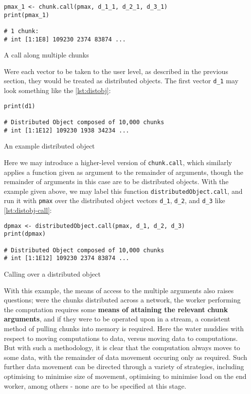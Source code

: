 \begin{listing}
    \begin{verbatim}
pmax_1 <- chunk.call(pmax, d_1_1, d_2_1, d_3_1)
print(pmax_1)

# 1 chunk:
# int [1:1E8] 109230 2374 83874 ...
    \end{verbatim}
    \caption{A call along multiple chunks}
    \label{lst:call-along-chunks}
\end{listing}

Were each vector to be taken to the user level, as described in the
previous section, they would be treated as distributed objects. The
first vector \texttt{d\_1} may look something like the \ref{lst:distobj}:

\begin{listing}
    \begin{verbatim}
print(d1)

# Distributed Object composed of 10,000 chunks
# int [1:1E12] 109230 1938 34234 ...
    \end{verbatim}
    \caption{An example distributed object}
    \label{lst:distobj}
\end{listing}

Here we may introduce a higher-level version of \texttt{chunk.call},
which similarly applies a function given as argument to the remainder of
arguments, though the remainder of arguments in this case are to be
distributed objects. With the example given above, we may label this
function \texttt{distributedObject.call}, and run it with \texttt{pmax}
over the distributed object vectors \texttt{d\_1}, \texttt{d\_2}, and
\texttt{d\_3} like \ref{lst:distobj-call}:

\begin{listing}
    \begin{verbatim}
dpmax <- distributedObject.call(pmax, d_1, d_2, d_3)
print(dpmax)

# Distributed Object composed of 10,000 chunks
# int [1:1E12] 109230 2374 83874 ...
    \end{verbatim}
    \caption{Calling over a distributed object}
    \label{lst:distobj-call}
\end{listing}

With this example, the means of access to the multiple arguments also
raises questions; were the chunks distributed across a network, the
worker performing the computation requires some \textbf{means of
    attaining the relevant chunk arguments}, and if they were to be operated
upon in a stream, a consistent method of pulling chunks into memory is
required. Here the water muddies with respect to moving computations to
data, versus moving data to computations. But with such a methodology,
it is clear that the computation always moves to some data, with the
remainder of data movement occuring only as required. Such further data
movement can be directed through a variety of strategies, including
optimising to minimise size of movement, optimising to minimise load on
the end worker, among others - none are to be specified at this stage.

